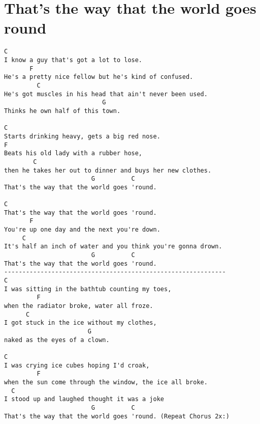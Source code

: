 \documentclass[leqno]{memoir}
\begin{document}
\chapter{That's the way that the world goes round}
\begin{verbatim}
C
I know a guy that's got a lot to lose.
       F
He's a pretty nice fellow but he's kind of confused.
         C
He's got muscles in his head that ain't never been used.
                           G
Thinks he own half of this town.

C
Starts drinking heavy, gets a big red nose.
F
Beats his old lady with a rubber hose,
        C
then he takes her out to dinner and buys her new clothes.
                        G          C
That's the way that the world goes 'round.

C
That's the way that the world goes 'round.
       F
You're up one day and the next you're down.
     C
It's half an inch of water and you think you're gonna drown.
                        G          C
That's the way that the world goes 'round.
-------------------------------------------------------------
C
I was sitting in the bathtub counting my toes,
         F
when the radiator broke, water all froze.
      C
I got stuck in the ice without my clothes,
                       G
naked as the eyes of a clown.

C
I was crying ice cubes hoping I'd croak,
         F
when the sun come through the window, the ice all broke.
  C
I stood up and laughed thought it was a joke
                        G          C
That's the way that the world goes 'round. (Repeat Chorus 2x:)
\end{verbatim}
\newpage
\end{document}
